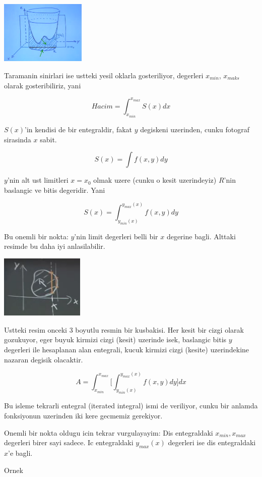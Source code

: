 \documentclass[12pt,fleqn]{article}
\begin{document}
\includegraphics[height=3cm]{16_6.png}

Taramanin sinirlari ise ustteki yesil oklarla gosteriliyor, degerleri
$x_{min}$, $x_{maks}$ olarak gosteribiliriz, yani

\[ Hacim = \int_{x_{min}}^{x_{max}} S(x) dx \]

$S(x)$'in kendisi de bir entegraldir, fakat $y$ degiskeni uzerinden, cunku
fotograf sirasinda $x$ sabit. 

\[ S(x) = \int f(x,y) dy \]

$y$'nin alt ust limitleri $x=x_0$ olmak uzere (cunku o kesit uzerindeyiz)
$R$'nin baslangic ve bitis degeridir. Yani

\[ S(x) = \int_{y_{min}(x)}^{y_{max}(x)} f(x,y) dy \]

Bu onemli bir nokta: $y$'nin limit degerleri belli bir $x$ degerine
bagli. Alttaki resimde bu daha iyi anlasilabilir. 

\includegraphics[height=3cm]{16_7.png}

Ustteki resim onceki 3 boyutlu resmin bir kusbakisi. Her kesit bir cizgi
olarak gozukuyor, eger buyuk kirmizi cizgi (kesit) uzerinde isek, baslangic
bitis $y$ degerleri ile hesaplanan alan entegrali, kucuk kirmizi cizgi
(kesite) uzerindekine nazaran degisik olacaktir.

\[ A = \int_{x_{min}}^{x_{max}} 
\bigg[ 
\int_{y_{min}(x)}^{y_{max}(x)} f(x,y) dy 
\bigg] dx
 \]


Bu isleme tekrarli entegral (iterated integral) ismi de veriliyor, cunku
bir anlamda fonksiyonun uzerinden iki kere gecmemiz gerekiyor. 

Onemli bir nokta oldugu icin tekrar vurgulayayim: Dis entegraldaki
$x_{min}, x_{max}$ degerleri birer sayi sadece. Ic entegraldaki
$y_{max}(x)$ degerleri ise dis entegraldaki $x$'e bagli. 

Ornek
\end{document}
